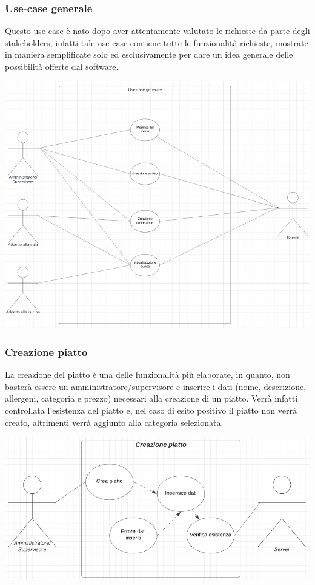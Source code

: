 \subsubsection{Use-case generale}
Questo use-case è nato dopo aver attentamente valutato le richieste da parte degli stakeholders, infatti tale use-case contiene tutte le funzionalità richieste, mostrate in maniera semplificate solo ed esclusivamente per dare un idea generale delle possibilità offerte dal software.
\begin{center}
  \includegraphics[scale=0.8]{img/use_case/use_case_generale.png}
\end{center}

\subsubsection{Creazione piatto}
La creazione del piatto è una delle funzionalità più elaborate, in quanto, non basterà essere un amministratore/supervisore e inserire i dati (nome, descrizione, allergeni, categoria e prezzo) necessari alla creazione di un piatto. Verrà infatti controllata l'esistenza del piatto e, nel caso di esito positivo il piatto non verrà creato, altrimenti verrà aggiunto alla categoria selezionata.
\begin{center}
  \includegraphics[scale=0.65]{img/use_case/use_case-creazione_piatto.png}
\end{center}
